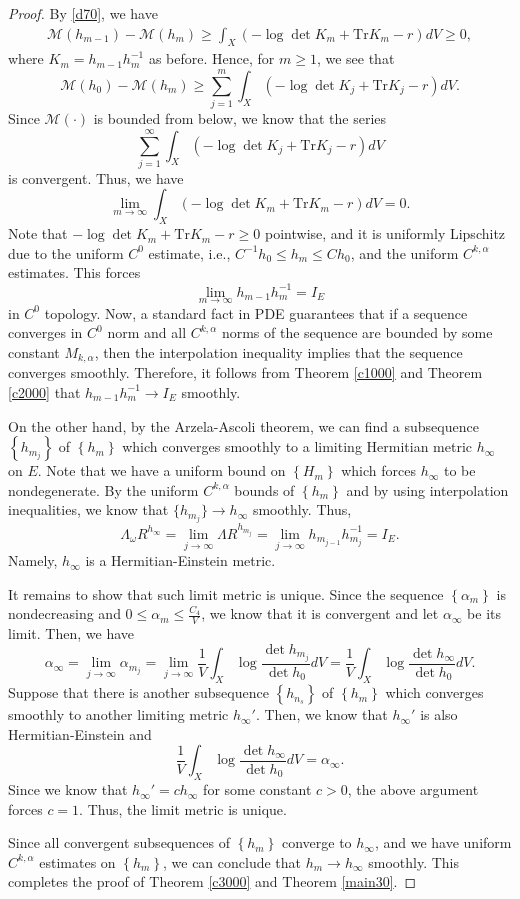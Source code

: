 \documentclass[11pt]{amsart}
\numberwithin{equation}{section}
\theoremstyle{remark}
\newcommand{\he}{Hermitian-Einstein }
\newcommand{\M}{{\mathcal M}}
\newcommand{\lb}{\left (}
\newcommand{\rb}{\right )}
\newcommand{\lfb}{\left \{}
\newcommand{\rfb}{\right \}}
\newcommand{\ga}{\alpha}
\newcommand{\tr}{\text{Tr}}
\begin{document}
\begin{proof}
By \eqref{d70}, we have
\begin{eqnarray}\label{910}
\M\lb h_{m-1}\rb-\M\lb h_{m}\rb \geq \int_X\lb  -\log\det K_m +\tr K_m -r\rb dV\geq 0,
\end{eqnarray}
where $K_m=h_{m-1}h_m^{-1}$ as before. Hence, for $m\geq 1$, we see that
\[
\M\lb h_{0}\rb-\M\lb h_{m}\rb \geq \sum_{j=1}^m \int_X\lb  -\log\det K_j +\tr K_j -r\rb dV.
\]
Since $\M(\cdot)$ is bounded from below, we know that the series
\[\sum_{j=1}^\infty \int_X\lb  -\log\det K_j +\tr K_j -r\rb dV\] is convergent.
Thus, we have
\[
\lim_{m\to\infty}\int_X\lb  -\log\det K_m +\tr K_m -r\rb dV=0.
\]
Note that $-\log\det K_m +\tr K_m -r \geq 0$ pointwise, and it is uniformly Lipschitz due to the uniform $C^0$ estimate, i.e., $C^{-1}h_0\leq h_m\leq C h_0$, and the uniform $C^{k,\ga}$ estimates.
This forces
\[
\lim_{m\to\infty}h_{m-1}h_m^{-1}=I_E
\]
in $C^0$ topology. Now, a standard fact in PDE guarantees that if a sequence converges in $C^0$ norm and all $C^{k,\ga}$ norms of the sequence are bounded by some constant $M_{k,\ga}$, then the interpolation inequality implies that the sequence converges smoothly.  Therefore, it follows from Theorem \ref{c1000} and Theorem \ref{c2000} that $h_{m-1}h_m^{-1}\to I_E$ smoothly.

On the other hand, by the Arzela-Ascoli theorem, we can find a subsequence $\lfb h_{m_j}\rfb$ of $\lfb h_m\rfb$ which converges smoothly to a limiting Hermitian metric $h_\infty$ on $E$. Note that we have a uniform bound on $\lfb H_m\rfb$ which forces $h_\infty$ to be nondegenerate. By the uniform $C^{k,\ga}$ bounds of $\lfb h_m\rfb$ and by using interpolation inequalities,  we know that $\{h_{m_j}\} \to h_\infty$ smoothly. Thus,
\[
\Lambda_\omega R^{h_\infty}=\lim_{j\to\infty}\Lambda R^{h_{m_j}}=\lim_{j\to\infty}h_{m_{j-1}}h_{m_j}^{-1}=I_E.
\]
Namely, $h_\infty$ is a \he metric.

It remains to show that such limit metric is unique. Since the sequence $\lfb \ga_m\rfb$ is nondecreasing and $0\leq \ga_m\leq \frac{C_4}{V}$, we know that it is convergent and let $\ga_{\infty}$ be its limit. Then, we have
\[
\ga_{\infty}=\lim_{j\to\infty}\ga_{m_j}=\lim_{j\to\infty}\frac 1V \int_X \log \frac{\det h_{m_j}}{\det h_0}dV=\frac 1V \int_X \log \frac{\det h_{\infty}}{\det h_0}dV.
\]
Suppose that there is another subsequence $\lfb h_{n_s}\rfb$ of $\lfb h_m\rfb$ which converges smoothly to another limiting metric $h_\infty'$. Then, we know that $h_\infty'$ is also \he and
\[
\frac 1V \int_X \log \frac{\det h_{\infty}}{\det h_0}dV=\ga_{\infty}.
\]
Since we know that $h_\infty'=ch_\infty$ for some constant $c>0$, the above argument forces $c=1$. Thus, the limit metric is unique.

Since all convergent subsequences of $\lfb h_m\rfb$ converge to $h_\infty$, and we have uniform $C^{k,\ga}$ estimates on $\lfb h_m\rfb$, we can conclude that $h_m\to h_\infty$ smoothly. This completes the proof of Theorem \ref{c3000} and Theorem \ref{main30}.

\end{proof}
\end{document}
